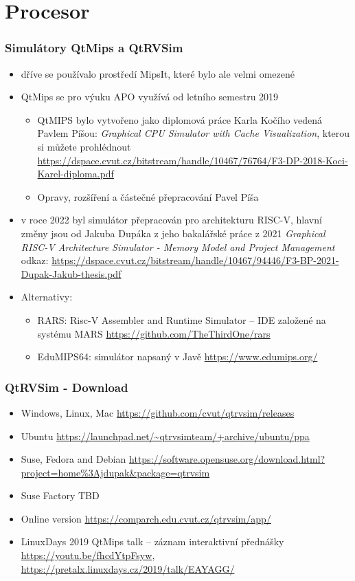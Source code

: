 \documentclass{beamer}
\subtitle{Lekce 03. Central Processing Unit (CPU)}
\author{Pavel Píša \phantom{xxxxxxx} Petr Štěpán \\ \small\texttt{pisa@fel.cvut.cz}\phantom{xxxx}\small\texttt{stepan@fel.cvut.cz}}
\begin{document}
\maketitle

\section{Procesor}

\begin{frame}
\frametitle{Simulátory QtMips a QtRVSim}

\begin{itemize}
\item dříve se používalo prostředí MipsIt, které bylo ale velmi omezené
\item QtMips se pro výuku APO využívá od letního semestru 2019
\begin{itemize}
\item QtMIPS bylo vytvořeno jako diplomová práce Karla Kočího vedená Pavlem Píšou: \textit{Graphical CPU Simulator with Cache Visualization}, kterou si můžete prohlédnout \url{https://dspace.cvut.cz/bitstream/handle/10467/76764/F3-DP-2018-Koci-Karel-diploma.pdf}
\item Opravy, rozšíření a částečné přepracování Pavel Píša
\end{itemize}
\item v roce 2022 byl simulátor přepracován pro architekturu RISC-V, hlavní změny jsou od Jakuba Dupáka z jeho bakalářské práce z 2021 \textit{Graphical RISC-V Architecture Simulator - Memory Model and Project Management} odkaz: \url{https://dspace.cvut.cz/bitstream/handle/10467/94446/F3-BP-2021-Dupak-Jakub-thesis.pdf}
\item Alternativy:
\begin{itemize}
 \item RARS: Risc-V Assembler and Runtime Simulator -- IDE založené na systému MARS \url{https://github.com/TheThirdOne/rars}
 \item EduMIPS64: simulátor napsaný v Javě \url{https://www.edumips.org/}
\end{itemize}
\end{itemize}

\end{frame}


\begin{frame}
\frametitle{QtRVSim - Download}
\begin{itemize}
\item Windows, Linux, Mac \url{https://github.com/cvut/qtrvsim/releases}
\item  Ubuntu \url{https://launchpad.net/~qtrvsimteam/+archive/ubuntu/ppa}
\item Suse, Fedora and Debian \url{https://software.opensuse.org/download.html?project=home\%3Ajdupak\&package=qtrvsim}
\item Suse Factory TBD
\item Online version \url{https://comparch.edu.cvut.cz/qtrvsim/app/}
\item LinuxDays 2019 QtMips talk – záznam interaktivní přednášky \url{https://youtu.be/fhcdYtpFsyw}, \url{https://pretalx.linuxdays.cz/2019/talk/EAYAGG/}
\end{itemize}
\end{frame}
\end{document}
